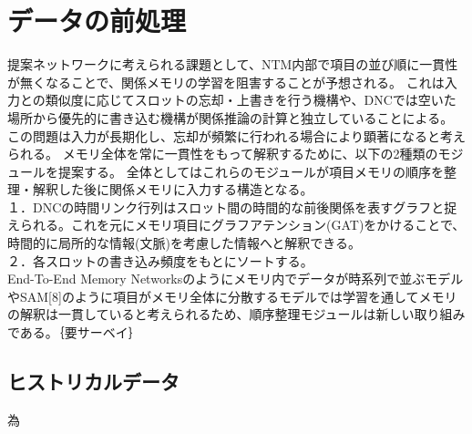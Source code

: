 \chapter{データの前処理}

\label{chap:prepro}
提案ネットワークに考えられる課題として、NTM内部で項目の並び順に一貫性が無くなることで、関係メモリの学習を阻害することが予想される。
これは入力との類似度に応じてスロットの忘却・上書きを行う機構や、DNCでは空いた場所から優先的に書き込む機構が関係推論の計算と独立していることによる。
この問題は入力が長期化し、忘却が頻繁に行われる場合により顕著になると考えられる。
メモリ全体を常に一貫性をもって解釈するために、以下の2種類のモジュールを提案する。
全体としてはこれらのモジュールが項目メモリの順序を整理・解釈した後に関係メモリに入力する構造となる。
\\１．DNCの時間リンク行列はスロット間の時間的な前後関係を表すグラフと捉えられる。これを元にメモリ項目にグラフアテンション(GAT)\cite{gat}をかけることで、時間的に局所的な情報(文脈)を考慮した情報へと解釈できる。
\\２．各スロットの書き込み頻度をもとにソートする。
\\End-To-End Memory Networks\cite{E2E}のようにメモリ内でデータが時系列で並ぶモデルやSAM[8]のように項目がメモリ全体に分散するモデルでは学習を通してメモリの解釈は一貫していると考えられるため、順序整理モジュールは新しい取り組みである。｛要サーベイ｝


\section{ヒストリカルデータ}
為